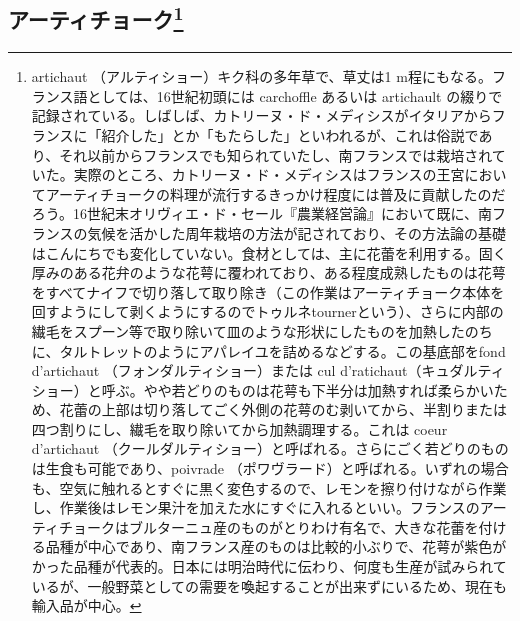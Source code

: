 \href{未、原文対照チェック}{} \href{未、日本語表現校正}{}
\href{未、その他修正}{} \href{未、原稿最終校正}{}

\begin{Main}

\hypertarget{artichauts}{%
\subsection[アーティチョーク]{\texorpdfstring{アーティチョーク\footnote{artichaut
  （アルティショー）キク科の多年草で、草丈は1
  m程にもなる。フランス語としては、16世紀初頭には carchoffle あるいは
  artichault
  の綴りで記録されている。しばしば、カトリーヌ・ド・メディシスがイタリアからフランスに「紹介した」とか「もたらした」といわれるが、これは俗説であり、それ以前からフランスでも知られていたし、南フランスでは栽培されていた。実際のところ、カトリーヌ・ド・メディシスはフランスの王宮においてアーティチョークの料理が流行するきっかけ程度には普及に貢献したのだろう。16世紀末オリヴィエ・ド・セール『農業経営論』において既に、南フランスの気候を活かした周年栽培の方法が記されており、その方法論の基礎はこんにちでも変化していない。食材としては、主に花蕾を利用する。固く厚みのある花弁のような花萼に覆われており、ある程度成熟したものは花萼をすべてナイフで切り落して取り除き（この作業はアーティチョーク本体を回すようにして剥くようにするのでトゥルネtournerという）、さらに内部の繊毛をスプーン等で取り除いて皿のような形状にしたものを加熱したのちに、タルトレットのようにアパレイユを詰めるなどする。この基底部をfond
  d'artichaut （フォンダルティショー）または cul
  d'ratichaut（キュダルティショー）と呼ぶ。やや若どりのものは花萼も下半分は加熱すれば柔らかいため、花蕾の上部は切り落してごく外側の花萼のむ剥いてから、半割りまたは四つ割りにし、繊毛を取り除いてから加熱調理する。これは
  coeur d'artichaut
  （クールダルティショー）と呼ばれる。さらにごく若どりのものは生食も可能であり、poivrade
  （ポワヴラード）と呼ばれる。いずれの場合も、空気に触れるとすぐに黒く変色するので、レモンを擦り付けながら作業し、作業後はレモン果汁を加えた水にすぐに入れるといい。フランスのアーティチョークはブルターニュ産のものがとりわけ有名で、大きな花蕾を付ける品種が中心であり、南フランス産のものは比較的小ぶりで、花萼が紫色がかった品種が代表的。日本には明治時代に伝わり、何度も生産が試みられているが、一般野菜としての需要を喚起することが出来ずにいるため、現在も輸入品が中心。}}{アーティチョーク}}\label{artichauts}}


\end{Main}

